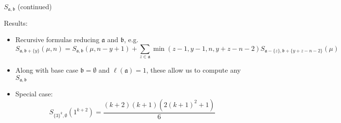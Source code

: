 \documentclass{beamer}
\renewcommand{\a}{\mathfrak a}
\renewcommand{\b}{\mathfrak b}
\theoremstyle{definition}
\begin{document}
                                                                                                                                                                                                                          \begin{frame}{$S_{\a,\b}$ (continued)}

                                                                                                                                                                                                                            Results:
                                                                                                                                                                                                                            \begin{itemize}
                                                                                                                                                                                                                            \item  Recursive formulas reducing $\a$ and $\b$, e.g.
                                 \tiny{                                                                                                                                                                                             \[
                                   S_{\mathfrak a,\mathfrak b+\{y\}}(\mu, n) =S_{\mathfrak a,\mathfrak b}(\mu, n-y+1) +\sum_{z\in\mathfrak a}\min(z-1,y-1,n,y+z-n-2)S_{\mathfrak a-\{z\},\mathfrak b+\{y+z-n-2\}}(\mu)                                                                                                                                                                                           \]}
                                 \normalsize\item {Along with base case $\b=\emptyset$ and $\ell(\a)=1$, these allow us to compute any $S_{\a,\b}$}
                               \item Special case:
                                 \[
                                 S_{\{3\}^k,\emptyset}(1^{k+2})=\frac{(k+2)(k+1)(2(k+1)^2+1)}{6}
                                 \]
                                                                                                                                                                                                                            \end{itemize}
                                                                                                                                                                                                                          \end{frame}
\end{document}
